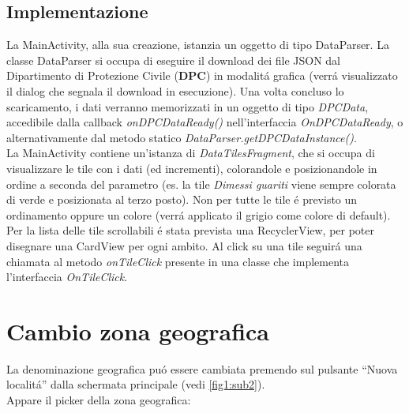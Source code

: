 \documentclass{article}
\newcommand{\quotes}[1]{``#1''}
\begin{document}
    \subsection{Implementazione}
    La MainActivity, alla sua creazione, istanzia un oggetto di tipo DataParser.
    La classe DataParser si occupa di eseguire il download dei file JSON dal Dipartimento di Protezione Civile (\textbf{DPC}) in modalitá grafica (verrá visualizzato il dialog che segnala il download in esecuzione).
    Una volta concluso lo scaricamento, i dati verranno memorizzati in un oggetto di tipo \emph{DPCData}, accedibile dalla callback \emph{onDPCDataReady()} nell'interfaccia \emph{OnDPCDataReady}, o alternativamente dal metodo statico \emph{DataParser.getDPCDataInstance()}.
    \\
    La MainActivity contiene un'istanza di \emph{DataTilesFragment}, che si occupa di visualizzare le tile con i dati (ed incrementi), colorandole e posizionandole in ordine a seconda del parametro 
    (es. la tile \emph{Dimessi guariti} viene sempre colorata di verde e posizionata al terzo posto). Non per tutte le tile é previsto un ordinamento oppure un colore (verrá applicato il grigio come colore di default).
    \\
    Per la lista delle tile scrollabili é stata prevista una RecyclerView, per poter disegnare una CardView per ogni ambito.
    Al click su una tile seguirá una chiamata al metodo \emph{onTileClick} presente in una classe che implementa l'interfaccia \emph{OnTileClick}.

    \section{Cambio zona geografica}
    La denominazione geografica puó essere cambiata premendo sul pulsante \quotes{Nuova localitá} dalla schermata principale (vedi \ref{fig1:sub2}).
    \\
    Appare il picker della zona geografica:
\end{document}

